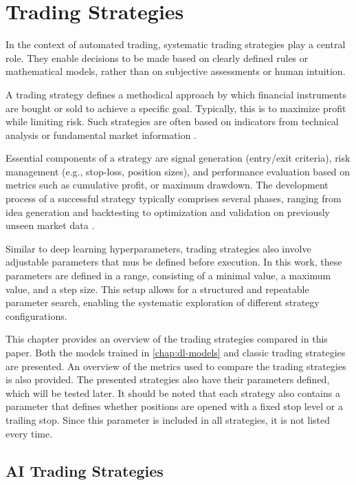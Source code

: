 
\section{Trading Strategies}
\label{chap:trading-strategies}

In the context of automated trading, systematic trading strategies play a central role.
They enable decisions to be made based on clearly defined rules or mathematical models, rather than on subjective assessments or human intuition.

A trading strategy defines a methodical approach by which financial instruments are bought or sold to achieve a specific goal.
Typically, this is to maximize profit while limiting risk.
Such strategies are often based on indicators from technical analysis or fundamental market information \cite{investopia-trading-strategy}.

Essential components of a strategy are signal generation (entry/exit criteria), risk management (e.g., stop-loss, position sizes), and performance evaluation based on metrics such as cumulative profit, or maximum drawdown.
The development process of a successful strategy typically comprises several phases, ranging from idea generation and backtesting to optimization and validation on previously unseen market data \cite{investopia-trading-strategy-components}.

Similar to deep learning hyperparameters, trading strategies also involve adjustable parameters that mus be defined before execution.
In this work, these parameters are defined in a range, consisting of a minimal value, a maximum value, and a step size.
This setup allows for a structured and repeatable parameter search, enabling the systematic exploration of different strategy configurations.

This chapter provides an overview of the trading strategies compared in this paper.
Both the models trained in \autoref{chap:dl-models} and classic trading strategies are presented.
An overview of the metrics used to compare the trading strategies is also provided.
The presented strategies also have their parameters defined, which will be tested later.
It should be noted that each strategy also contains a parameter that defines whether positions are opened with a fixed stop level or a trailing stop.
Since this parameter is included in all strategies, it is not listed every time.

\subsection{AI Trading Strategies}
\label{chap:ai-strategies}


